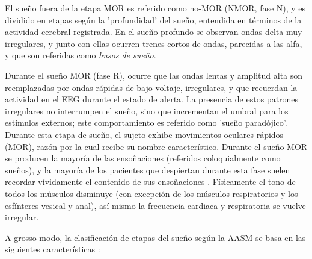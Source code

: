 El sue\~no fuera de la etapa MOR es referido como no-MOR (NMOR, fase N), y es dividido en etapas 
seg\'un la 'profundidad' del sue\~no, entendida en t\'erminos de la actividad cerebral registrada.
En el sue\~no profundo se observan ondas delta muy irregulares, y junto con ellas ocurren trenes 
cortos de ondas, parecidas a las alfa, y que son referidas como \textit{husos de sue\~no}. 

Durante el sue\~no MOR (fase R), ocurre que las ondas lentas y amplitud alta son reemplazadas por 
ondas r\'apidas de bajo voltaje, irregulares, y que recuerdan la actividad en el EEG durante el 
estado de alerta.
La presencia de estos patrones irregulares no interrumpen el sue\~no, sino que incrementan el 
umbral para los est\'imulos externos; este comportamiento es referido como 'sue\~no parad\'ojico'.
Durante esta etapa de sue\~no, el sujeto exhibe movimientos oculares r\'apidos (MOR), raz\'on por 
la cual recibe su nombre caracter\'istico.
Durante el sue\~no MOR se producen la mayor\'ia de las enso\~naciones (referidos coloquialmente 
como sue\~nos), y la mayor\'ia de los pacientes que despiertan durante esta fase suelen recordar 
v\'ividamente el contenido de sus enso\~naciones \cite{Chokroverty09}.
F\'isicamente el tono de todos los m\'usculos disminuye (con excepci\'on de los m\'usculos 
respiratorios y los esf\'interes vesical y anal), as\'i mismo la frecuencia cardiaca y respiratoria 
se vuelve irregular.

A grosso modo, la clasificaci\'on de etapas del sue\~no seg\'un la AASM se basa en las siguientes
caracter\'isticas \cite{Hori01}:

